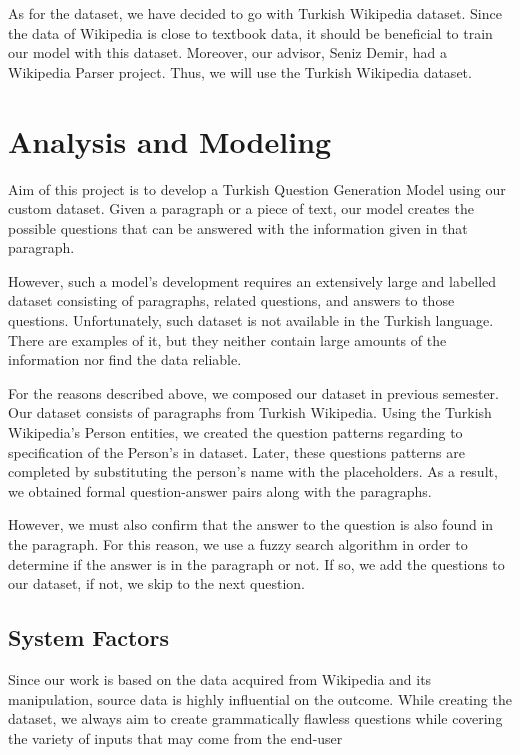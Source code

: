 \documentclass{mefsdp}
\begin{document}
	As for the dataset, we have decided to go with Turkish Wikipedia dataset. Since the data of Wikipedia is close to textbook data, it should be beneficial to train our model with this dataset. Moreover, our advisor, Seniz Demir, had a Wikipedia Parser project. Thus, we will use the Turkish Wikipedia dataset.
	
	
	
	\section{Analysis and Modeling}
	\label{refhere}
	Aim of this project is to develop a Turkish Question Generation Model using our custom dataset. Given a paragraph or a piece of text, our model creates the possible questions that can be answered with the information given in that paragraph. \newline \par
	
	However, such a model's development requires an extensively large and labelled dataset consisting of paragraphs, related questions, and answers to those questions. Unfortunately, such dataset is not available in the Turkish language. There are examples of it, but they neither contain large amounts of the information nor find the data reliable. \newline \par
	
	For the reasons described above, we composed our dataset in previous semester. Our dataset consists of paragraphs from Turkish Wikipedia. Using the Turkish Wikipedia's Person entities, we created the question patterns regarding to specification of the Person's in dataset. Later, these questions patterns are completed by substituting the person's name with the placeholders. As a result, we obtained formal question-answer pairs along with the paragraphs. \newline \par
	
	However, we must also confirm that the answer to the question is also found in the paragraph. For this reason, we use a fuzzy search algorithm in order to determine if the answer is in the paragraph or not. If so, we add the questions to our dataset, if not, we skip to the next question. \newline \par
	
	
	
	\subsection{System Factors}
	Since our work is based on the data acquired from Wikipedia and its manipulation, source data is highly influential on the outcome. While creating the dataset, we always aim to create grammatically flawless questions while covering the variety of inputs that may come from the end-user
	
\end{document}
